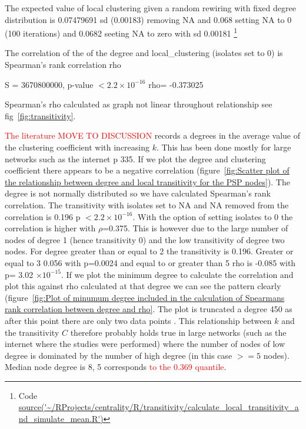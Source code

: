 The expected value of local clustering given a random rewiring with fixed degree distribution is 0.07479691 sd (0.00183) removing NA and 0.068 setting NA to 0 (100 iterations) and 0.0682 seeting NA to zero with sd 0.00181 \footnote{Code  \url{source('~/RProjects/centrality/R/transitivity/calculate_local_transitivity_and_simulate_mean.R')} }



The correlation of the of the degree and local\_clustering (isolates set to 0)  is 
	Spearman's rank correlation rho

S = 3670800000, p-value $< 2.2 \times 10^{-16}$
      rho= 
-0.373025 

Spearman's rho calculated as graph not linear throughout relationship see fig~\ref{fig:transitivity}.

\textcolor{red}{The literature MOVE TO DISCUSSION} records a degrees in the average value of the clustering coefficient with increasing $k$. This has been done mostly for large networks such as the internet \cite{newman2018networks} p 335. If we plot the degree and clustering coefficient there appears to be a negative correlation (figure~\ref{fig:Scatter plot of the relationship between degree and local transitivity for the PSP nodes}). The degree is not normally distributed so we have calculated Spearman's rank correlation. The transitivity with isolates set to NA and NA removed from the correlation is 0.196 p $< 2.2 \times 10^{-16}$. With the option of setting isolates to 0 the correlation is higher with $\rho$=0.375. This is however due to the large number of nodes of degree 1 (hence transitivity 0) and the low transitivity of degree two nodes. For degree greater than or equal to 2 the transitivity is 0.196. Greater or equal to 3 0.056 with p=0.0024 and equal to or greater than 5 rho is -0.085 with p= 3.02 $\times 10^{-15}$. If we plot the minimum degree to calculate the correlation and plot
this against rho calculated at that degree we can see the pattern clearly (figure~\ref{fig:Plot of minumum degree included in the calculation of Spearmans rank correlation between degree and rho}. The plot is truncated a degree 450 as after this point there are only two data points .
This relationship between $k$ and the transitivity $C$ therefore probably holds true in large networks (such as the internet where the studies were performed) where the number of nodes of low degree is dominated by the number of high degree (in this case $>=5$ nodes). Median node degree is 8, 5 corresponds \textcolor{red}{ to the 0.369 quantile}.


